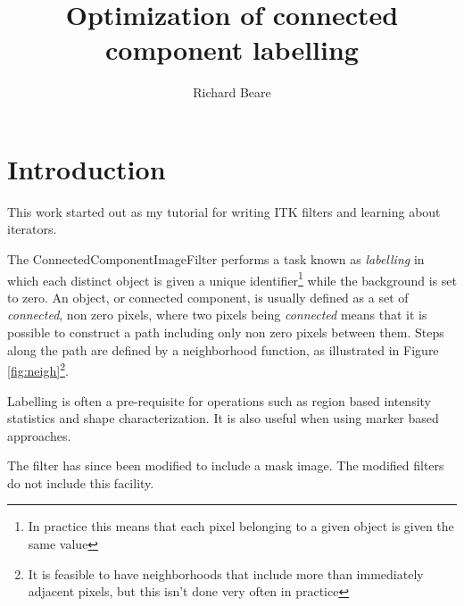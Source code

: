 \documentclass[IJ]{cesj}
\author{Richard Beare}
\institute{Department of Medicine, Monash University, Australia}
\title{Optimization of connected component labelling}
\begin{document}
\lstset{language=c++}
\maketitle
\section{Introduction}
This work started out as my tutorial for writing ITK filters and
learning about iterators.

The ConnectedComponentImageFilter performs a task known as {\em
labelling} in which each distinct object is given a unique
identifier\footnote{In practice this means that each pixel belonging
to a given object is given the same value} while the background is set
to zero. An object, or connected component, is usually defined as a
set of {\em connected}, non zero pixels, where two pixels being {\em
connected} means that it is possible to construct a path including
only non zero pixels between them. Steps along the path are defined by
a neighborhood function, as illustrated in Figure \ref{fig:neigh}\footnote{It
is feasible to have neighborhoods that include more than immediately
adjacent pixels, but this isn't done very often in practice}.

Labelling is often a pre-requisite for operations such as region based
intensity statistics and shape characterization. It is also useful
when using marker based approaches.

The filter has since been modified to include a mask image. The
modified filters do not include this facility.
\end{document}
